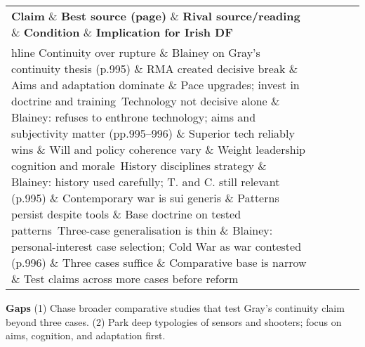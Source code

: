  
\begin{tabular}{p{3.2cm}p{4.2cm}p{3.6cm}p{3.2cm}p{4.2cm}}
	\textbf{Claim} \& \textbf{Best source (page)} \& \textbf{Rival source/reading} \& \textbf{Condition} \& \textbf{Implication for Irish DF}\\hline
	Continuity over rupture \& Blainey on Gray’s continuity thesis (p.995) \& RMA created decisive break \& Aims and adaptation dominate \& Pace upgrades; invest in doctrine and training\
	Technology not decisive alone \& Blainey: refuses to enthrone technology; aims and subjectivity matter (pp.995–996) \& Superior tech reliably wins \& Will and policy coherence vary \& Weight leadership cognition and morale\
	History disciplines strategy \& Blainey: history used carefully; T. and C. still relevant (p.995) \& Contemporary war is sui generis \& Patterns persist despite tools \& Base doctrine on tested patterns\
	Three-case generalisation is thin \& Blainey: personal-interest case selection; Cold War as war contested (p.996) \& Three cases suffice \& Comparative base is narrow \& Test claims across more cases before reform\
\end{tabular}


\textbf{Gaps}
(1) Chase broader comparative studies that test Gray’s continuity claim beyond three cases.
(2) Park deep typologies of sensors and shooters; focus on aims, cognition, and adaptation first.

\parencite{BROSE_2019}
